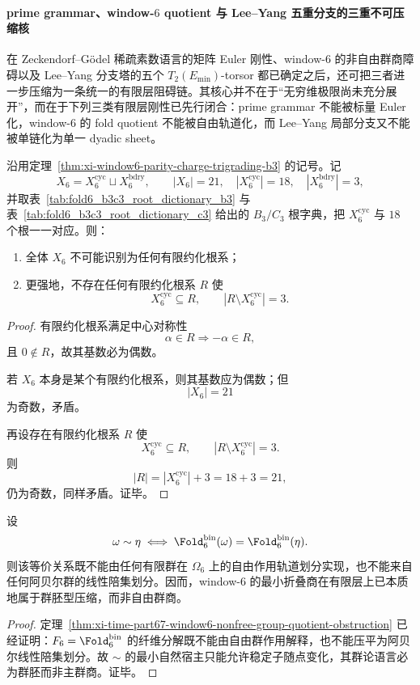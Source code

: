 \paragraph{prime grammar、window-\texorpdfstring{$6$}{6} quotient 与 Lee--Yang 五重分支的三重不可压缩核}
在 Zeckendorf--G\"odel 稀疏素数语言的矩阵 Euler 刚性、window-\(6\) 的非自由群商障碍以及 Lee--Yang 分支塔的五个 \(T_2(E_{\min})\)-torsor 都已确定之后，还可把三者进一步压缩为一条统一的有限层阻碍链。其核心并不在于“无穷维极限尚未充分展开”，而在于下列三类有限层刚性已先行闭合：prime grammar 不能被标量 Euler 化，window-\(6\) 的 fold quotient 不能被自由轨道化，而 Lee--Yang 局部分支又不能被单链化为单一 dyadic sheet。

\begin{theorem}\label{thm:xi-time-part9zp-window6-odd-residual-root-closure-obstruction}
沿用定理~\ref{thm:xi-window6-parity-charge-trigrading-b3} 的记号。记
\[
X_6=X_6^{\mathrm{cyc}}\sqcup X_6^{\mathrm{bdry}},
\qquad
|X_6|=21,\quad |X_6^{\mathrm{cyc}}|=18,\quad |X_6^{\mathrm{bdry}}|=3,
\]
并取表~\ref{tab:fold6_b3c3_root_dictionary_b3} 与表~\ref{tab:fold6_b3c3_root_dictionary_c3} 给出的 \(B_3/C_3\) 根字典，把 \(X_6^{\mathrm{cyc}}\) 与 \(18\) 个根一一对应。则：
\begin{enumerate}
  \item 全体 \(X_6\) 不可能识别为任何有限约化根系；
  \item 更强地，不存在任何有限约化根系 \(R\) 使
  \[
  X_6^{\mathrm{cyc}}\subseteq R,
  \qquad
  |R\setminus X_6^{\mathrm{cyc}}|=3.
  \]
\end{enumerate}
\end{theorem}
\begin{proof}
有限约化根系满足中心对称性
\[
\alpha\in R\Longrightarrow -\alpha\in R,
\]
且 \(0\notin R\)，故其基数必为偶数。

若 \(X_6\) 本身是某个有限约化根系，则其基数应为偶数；但
\[
|X_6|=21
\]
为奇数，矛盾。

再设存在有限约化根系 \(R\) 使
\[
X_6^{\mathrm{cyc}}\subseteq R,
\qquad
|R\setminus X_6^{\mathrm{cyc}}|=3.
\]
则
\[
|R|=|X_6^{\mathrm{cyc}}|+3=18+3=21,
\]
仍为奇数，同样矛盾。证毕。
\end{proof}

\begin{corollary}\label{cor:xi-time-part9zp-window6-quotient-intrinsically-groupoidal}
设
\[
\omega\sim\eta
\iff
\Fold_6^{\mathrm{bin}}(\omega)=\Fold_6^{\mathrm{bin}}(\eta).
\]
则该等价关系既不能由任何有限群在 \(\Omega_6\) 上的自由作用轨道划分实现，也不能来自任何阿贝尔群的线性陪集划分。因而，window-\(6\) 的最小折叠商在有限层上已本质地属于群胚型压缩，而非自由群商。
\end{corollary}
\begin{proof}
定理~\ref{thm:xi-time-part67-window6-nonfree-group-quotient-obstruction} 已经证明：\(F_6=\Fold_6^{\mathrm{bin}}\) 的纤维分解既不能由自由群作用解释，也不能压平为阿贝尔线性陪集划分。故 \(\sim\) 的最小自然宿主只能允许稳定子随点变化，其群论语言必为群胚而非主群商。证毕。
\end{proof}

